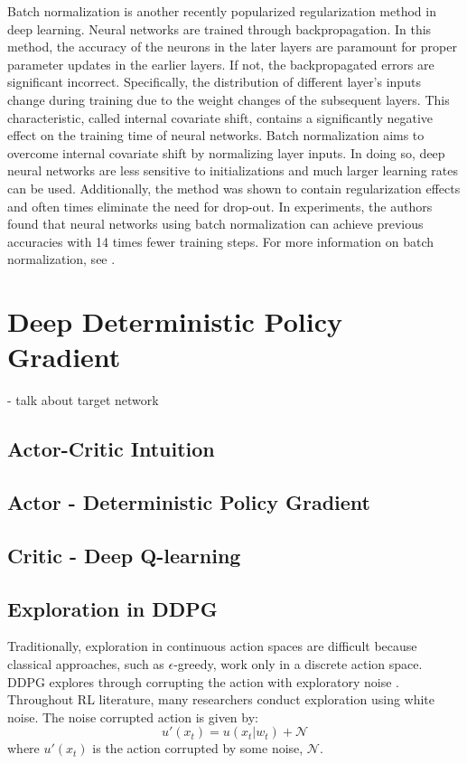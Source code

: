 Batch normalization is another recently popularized regularization method in deep learning.  Neural networks are trained through backpropagation.  In this method, the accuracy of the neurons in the later layers are paramount for proper parameter updates in the earlier layers.  If not, the backpropagated errors are significant incorrect. Specifically, the distribution of different layer's inputs change during training due to the weight changes of the subsequent layers. This characteristic, called internal covariate shift, contains a significantly negative effect on the training time of neural networks.  Batch normalization aims to overcome internal covariate shift by normalizing layer inputs.  In doing so, deep neural networks are less sensitive to initializations and much larger learning rates can be used. Additionally, the method was shown to contain regularization effects and often times eliminate the need for drop-out.  In experiments, the authors found that neural networks using batch normalization can achieve previous accuracies with 14 times fewer training steps.  For more information on batch normalization, see \cite{batch_norm}.





\section{Deep Deterministic Policy Gradient}
- talk about target network
\subsection{Actor-Critic Intuition}
\subsection{Actor - Deterministic Policy Gradient}
\subsection{Critic - Deep Q-learning}


\subsection{Exploration in DDPG}
Traditionally, exploration in continuous action spaces are difficult because classical approaches, such as $\epsilon$-greedy, work only in a discrete action space.  DDPG explores through corrupting the action with exploratory noise \cite{ddpg}.  Throughout RL literature, many researchers conduct exploration using white noise. The noise corrupted action is given by:
\begin{equation}
    u'(x_t) = u(x_t|w_t) + \mathcal{N}
    \label{eq:01noise_corrupt}
\end{equation}
where $u'(x_t)$ is the action corrupted by some noise, $\mathcal{N}$.

